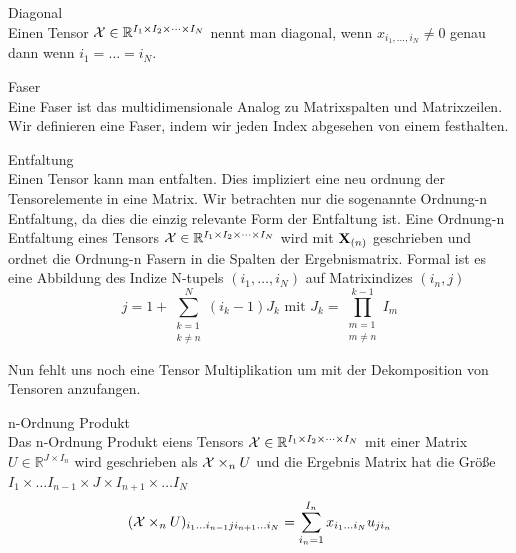\begin{Definition} Diagonal \\
Einen Tensor ${\cal X}  \in \mathbb{R}^{I_1 \times I_2 \times \dots \times I_N}$ nennt man diagonal, wenn
$x_{i_1,\dots,i_N} \neq 0$ genau dann wenn $i_1 = \dots = i_N$.
\end{Definition}

\begin{Definition} Faser \\
Eine Faser ist das multidimensionale Analog zu Matrixspalten und Matrixzeilen. Wir definieren eine Faser, indem wir jeden Index abgesehen von einem festhalten.
\end{Definition}

\begin{Bemerkung} Entfaltung \\
Einen Tensor kann man entfalten. Dies impliziert eine neu ordnung der Tensorelemente in eine Matrix.
Wir betrachten nur die sogenannte Ordnung-n Entfaltung, da dies die einzig relevante Form der Entfaltung ist.
Eine Ordnung-n Entfaltung eines Tensors ${\cal X}  \in \mathbb{R}^{I_1 \times I_2 \times \dots \times I_N}$ wird mit $\bold{X}_{(n)}$ geschrieben und ordnet die Ordnung-n Fasern in die Spalten der Ergebnismatrix.
Formal ist es eine Abbildung des Indize N-tupels $(i_1,\dots,i_N)$ auf Matrixindizes $(i_n,j) $
\begin{equation}
j=1+\sum_{\substack{k=1 \\ k \neq n}}^{N} (i_k-1)J_k \text{ mit } J_k = \prod_{\substack{m=1 \\ m \neq n}}^{k-1} I_m
\end{equation}
\end{Bemerkung}

Nun fehlt uns noch eine Tensor Multiplikation um mit der Dekomposition von Tensoren anzufangen. 

\begin{Definition} n-Ordnung Produkt \\
Das n-Ordnung Produkt eiens Tensors  ${\cal X}  \in \mathbb{R}^{I_1 \times I_2 \times \dots \times I_N}$ mit einer Matrix $U \in \mathbb{R}^{J \times I_n}$ wird geschrieben als ${\cal X} \times_n U$ und die Ergebnis Matrix hat die Größe $I_1 \times \dots I_{n-1} \times J \times I_{n+1} \times \dots I_N$
\begin{equation}
	({\cal X} \times_n U)_{i_1 \dots i_{n-1} j i_{n+1} \dots i_N} = \sum_{i_n = 1}^{I_n} x_{i_1 \dots i_N} u_{j i_n}
\end{equation}
\end{Definition}

